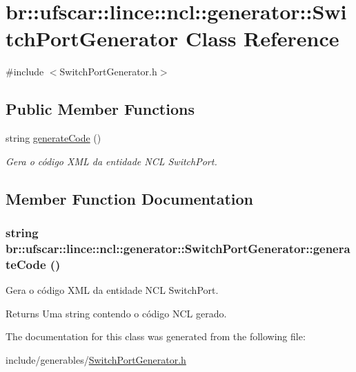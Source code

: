 \hypertarget{classbr_1_1ufscar_1_1lince_1_1ncl_1_1generator_1_1SwitchPortGenerator}{
\section{br::ufscar::lince::ncl::generator::SwitchPortGenerator Class Reference}
\label{classbr_1_1ufscar_1_1lince_1_1ncl_1_1generator_1_1SwitchPortGenerator}
}


{\ttfamily \#include $<$SwitchPortGenerator.h$>$}

\subsection*{Public Member Functions}
\begin{DoxyCompactItemize}
\item 
string \hyperlink{classbr_1_1ufscar_1_1lince_1_1ncl_1_1generator_1_1SwitchPortGenerator_adb27ed7ff05f32354401d24dabf57012}{generateCode} ()
\begin{DoxyCompactList}\small\item\em Gera o código XML da entidade NCL SwitchPort. \item\end{DoxyCompactList}\end{DoxyCompactItemize}


\subsection{Member Function Documentation}
\hypertarget{classbr_1_1ufscar_1_1lince_1_1ncl_1_1generator_1_1SwitchPortGenerator_adb27ed7ff05f32354401d24dabf57012}{
\subsubsection[{generateCode}]{\setlength{\rightskip}{0pt plus 5cm}string br::ufscar::lince::ncl::generator::SwitchPortGenerator::generateCode ()}}
\label{classbr_1_1ufscar_1_1lince_1_1ncl_1_1generator_1_1SwitchPortGenerator_adb27ed7ff05f32354401d24dabf57012}


Gera o código XML da entidade NCL SwitchPort. 

\begin{DoxyReturn}{Returns}
Uma string contendo o código NCL gerado. 
\end{DoxyReturn}


The documentation for this class was generated from the following file:\begin{DoxyCompactItemize}
\item 
include/generables/\hyperlink{SwitchPortGenerator_8h}{SwitchPortGenerator.h}\end{DoxyCompactItemize}
